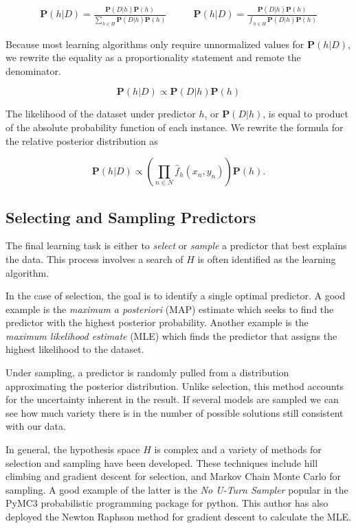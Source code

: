 \documentclass[twoside]{article}
\begin{document}
\begin{align}
\mathbf{P}(h|D)=\frac{\mathbf{P}(D|h)\mathbf{P}(h)}{\sum_{h \in H}\mathbf{P}(D|h)\mathbf{P}(h)} &
\qquad\mathbf{P}(h|D)=\frac{\mathbf{P}(D|h)\mathbf{P}(h)}{\int_{h \in H}\mathbf{P}(D|h)\mathbf{P}(h)}
\end{align}

Because most learning algorithms only require unnormalized values for \(\mathbf{P}(h|D)\), we rewrite the equality as a proportionality statement and remote the denominator.

\begin{equation}
\label{eq:bayes}
\mathbf{P}(h|D)\propto\mathbf{P}(D|h)\mathbf{P}(h)
\end{equation}

The likelihood of the dataset under predictor \(h\), or \(\mathbf{P}(D|h)\), is equal to product of the absolute probability function of each instance. We rewrite the formula for the relative posterior distribution as

\begin{equation}
\label{eq:bayes_likelihood_expanded}
\mathbf{P}(h|D)\propto \left( \prod_{n \in N} \hat{f}_h(x_n,y_n) \right) \mathbf{P}(h).
\end{equation}

\subsection{Selecting and Sampling Predictors}

The final learning task is either to \textit{select} or \textit{sample} a predictor that best explains the data. This process involves a search of \(H\) is often identified as the learning algorithm.

In the case of selection, the goal is to identify a single optimal predictor. A good example is the \textit{maximum a posteriori} (MAP) estimate which seeks to find the predictor with the highest posterior probability. Another example is the \textit{maximum likelihood estimate} (MLE) which finds the predictor that assigns the highest likelihood to the dataset.

Under sampling, a predictor is randomly pulled from a distribution approximating the posterior distribution. Unlike selection, this method accounts for the uncertainty inherent in the result. If several models are sampled we can see how much variety there is in the number of possible solutions still consistent with our data.

In general, the hypothesis space \(H\) is complex and a variety of methods for selection and sampling have been developed. These techniques include hill climbing and gradient descent for selection, and Markov Chain Monte Carlo for sampling. A good example of the latter is the \textit{No U-Turn Sampler}\cite{gelman} popular in the PyMC3\cite{pymc3} probabilistic programming package for python. This author has also deployed the Newton Raphson method for gradient descent to calculate the MLE.\cite{sklar_dirichlet}
\end{document}
